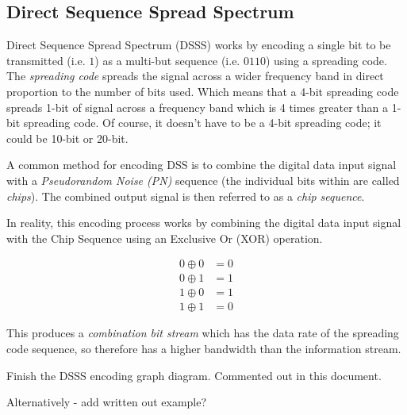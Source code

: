 \subsection{Direct Sequence Spread Spectrum}
Direct Sequence Spread Spectrum (DSSS) works by encoding a single bit to be transmitted (i.e. $1$) as a multi-but sequence (i.e. $0110$) using a spreading code. The \textit{spreading code} spreads the signal across a wider frequency band in direct proportion to the number of bits used. Which means that a 4-bit spreading code spreads 1-bit of signal across a frequency band which is 4 times greater than a 1-bit spreading code. Of course, it doesn't have to be a 4-bit spreading code; it could be 10-bit or 20-bit. 

A common method for encoding DSS is to combine the digital data input signal with a \textit{Pseudorandom Noise (PN)} sequence (the individual bits within are called \textit{chips}). The combined output signal is then referred to as a \textit{chip sequence}.

In reality, this encoding process works by combining the digital data input signal with the Chip Sequence using an Exclusive Or (XOR) operation. 

\begin{align*}
    0 \oplus 0 &= 0\\
    0 \oplus 1 &= 1\\
    1 \oplus 0 &= 1\\
    1 \oplus 1 &= 0
\end{align*}

This produces a \textit{combination bit stream} which has the data rate of the spreading code sequence, so therefore has a higher bandwidth than the information stream. 

\begin{todo}
Finish the DSSS encoding graph diagram. Commented out in this document.

Alternatively - add written out example?
\end{todo}




